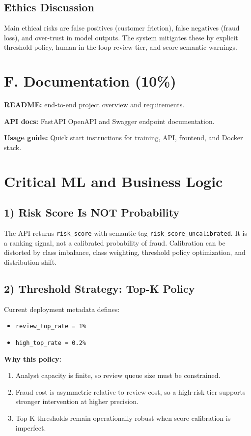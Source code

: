 \documentclass[11pt]{article}
\begin{document}
\subsection{Ethics Discussion}
Main ethical risks are false positives (customer friction), false negatives (fraud loss), and over-trust in model outputs. The system mitigates these by explicit threshold policy, human-in-the-loop review tier, and score semantic warnings.

\section{F. Documentation (10\%)}
\textbf{README:} end-to-end project overview and requirements.

\textbf{API docs:} FastAPI OpenAPI and Swagger endpoint documentation.

\textbf{Usage guide:} Quick start instructions for training, API, frontend, and Docker stack.

\section{Critical ML and Business Logic}

\subsection{1) Risk Score Is NOT Probability}
The API returns \texttt{risk\_score} with semantic tag \texttt{risk\_score\_uncalibrated}. It is a ranking signal, not a calibrated probability of fraud. Calibration can be distorted by class imbalance, class weighting, threshold policy optimization, and distribution shift.

\subsection{2) Threshold Strategy: Top-K Policy}
Current deployment metadata defines:
\begin{itemize}
\item \texttt{review\_top\_rate = 1\%}
\item \texttt{high\_top\_rate = 0.2\%}
\end{itemize}

\textbf{Why this policy:}
\begin{enumerate}
\item Analyst capacity is finite, so review queue size must be constrained.
\item Fraud cost is asymmetric relative to review cost, so a high-risk tier supports stronger intervention at higher precision.
\item Top-K thresholds remain operationally robust when score calibration is imperfect.
\end{enumerate}
\end{document}
